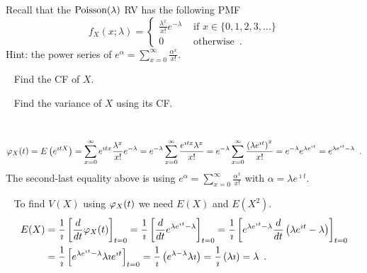 \begin{ExerciseList}
\Exercise


Recall that the $\mbox{{\rm Poisson}}(\lambda)$ RV has the following PMF
\[
f_X(x;\lambda) = 
\begin{cases}
\frac{\lambda^x}{x!}e^{-\lambda} & \text{ if } x \in \{0,1,2,3,\ldots \}\\
0 & \text{ otherwise} \enspace .
\end{cases}
\]
{Hint: the power series of $e^{\alpha} = \sum_{x=0}^{\infty} \frac{\alpha^x}{x!}$.}
\be
\item~
Find the CF of $X$.
\item~
Find the variance of $X$ using its CF.
\ee
\Answer
~\\
\be
\item~
\[
\varphi_X(t) = E\left(e^{\imath t X}\right)
= \sum_{x=0}^{\infty} e^{\imath t x} \frac{\lambda^x}{x!}e^{-\lambda}
= e^{-\lambda} \sum_{x=0}^{\infty} \frac{e^{\imath t x} \lambda^x}{x!}
= e^{-\lambda} \sum_{x=0}^{\infty} \frac{\left(\lambda e^{\imath t}\right)^x}{x!}
= e^{-\lambda} e^{\lambda e^{\imath t}} = e^{\lambda e^{\imath t} - \lambda} \enspace .
\]
The second-last equality above is using $e^{\alpha} = \sum_{x=0}^{\infty} \frac{\alpha^x}{x!}$ with $\alpha=\lambda e^{\imath t}$.
\item~
To find $V(X)$ using $\varphi_X(t)$ we need $E(X)$ and $E(X^2)$.
\begin{align*}
E(X) 
&= \frac{1}{\imath} \left[ \frac{d}{dt} \varphi_X(t) \right]_{t=0}
= \frac{1}{\imath} \left[ \frac{d}{dt} e^{\lambda e^{\imath t} - \lambda} \right]_{t=0}
= \frac{1}{\imath} \left[ e^{\lambda e^{\imath t} - \lambda} \frac{d}{dt} \left(\lambda e^{\imath t} - \lambda \right) \right]_{t=0}\\
&= \frac{1}{\imath} \left[ e^{\lambda e^{\imath t} - \lambda} \lambda \imath e^{\imath t} \right]_{t=0}
= \frac{1}{\imath} \left( e^{\lambda - \lambda} \lambda \imath \right)
= \frac{1}{\imath} \left( \lambda \imath \right) = \lambda \enspace .
\end{align*}

\end{ExerciseList}
